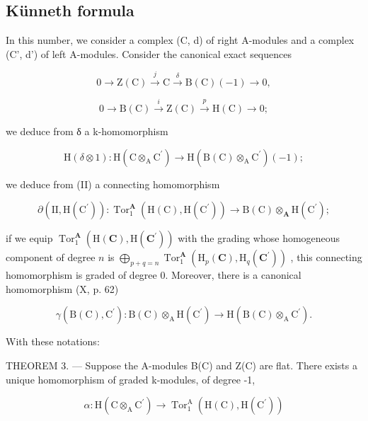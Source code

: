 \subsection{Künneth formula}

In this number, we consider a complex (C, d) of right A-modules and a complex (C', d') of left A-modules. Consider the canonical exact sequences

\[
0 \rightarrow \mathrm{Z} (\mathrm{C}) \stackrel {{j}} {{\rightarrow}} \mathrm{C} \stackrel {{\delta}} {{\rightarrow}} \mathrm{B} (\mathrm{C}) (- 1) \rightarrow 0,\tag{I}
\]

\[
0 \rightarrow \mathrm{B} (\mathrm{C}) \xrightarrow {i} \mathrm{Z} (\mathrm{C}) \xrightarrow {p} \mathrm{H} (\mathrm{C}) \rightarrow 0;\tag{II}
\]

we deduce from δ a k-homomorphism

\[
\mathrm{H} (\delta \otimes 1): \mathrm{H} (\mathrm{C} \otimes_ {\mathrm{A}} \mathrm{C} ^ {\prime}) \rightarrow \mathrm{H} (\mathrm{B} (\mathrm{C}) \otimes_ {\mathrm{A}} \mathrm{C} ^ {\prime}) (- 1);
\]

we deduce from (II) a connecting homomorphism

\[
\partial (\mathrm{II}, \mathrm{H} (\mathrm{C} ^ {\prime})): \operatorname{Tor} _ {1} ^ {\mathbf {A}} (\mathrm{H} (\mathrm{C}), \mathrm{H} (\mathrm{C} ^ {\prime})) \rightarrow \mathrm{B} (\mathrm{C}) \otimes_ {\mathbf {A}} \mathrm{H} (\mathrm{C} ^ {\prime});
\]

if we equip \(\operatorname{Tor}_{1}^{\mathbf{A}}(\mathrm{H}(\mathbf{C}),\mathrm{H}(\mathbf{C}^{\prime}))\) with the grading whose homogeneous component of degree \(n\) is \(\bigoplus_{p+q=n}\operatorname{Tor}_{1}^{\mathbf{A}}(\mathrm{H}_{p}(\mathbf{C}),\mathrm{H}_{q}(\mathbf{C}^{\prime}))\) , this connecting homomorphism is graded of degree 0. Moreover, there is a canonical homomorphism (X, p. 62)

\[
\gamma (\mathrm{B} (\mathrm{C}), \mathrm{C} ^ {\prime}): \mathrm{B} (\mathrm{C}) \otimes_ {\mathrm{A}} \mathrm{H} (\mathrm{C} ^ {\prime}) \rightarrow \mathrm{H} (\mathrm{B} (\mathrm{C}) \otimes_ {\mathrm{A}} \mathrm{C} ^ {\prime}).
\]

With these notations:

THEOREM 3. --- Suppose the A-modules B(C) and Z(C) are flat. There exists a unique homomorphism of graded k-modules, of degree -1,

\[
\alpha : \mathrm{H} (\mathrm{C} \otimes_ {\mathrm{A}} \mathrm{C} ^ {\prime}) \rightarrow \operatorname{Tor} _ {1} ^ {\mathrm{A}} (\mathrm{H} (\mathrm{C}), \mathrm{H} (\mathrm{C} ^ {\prime}))
\]


